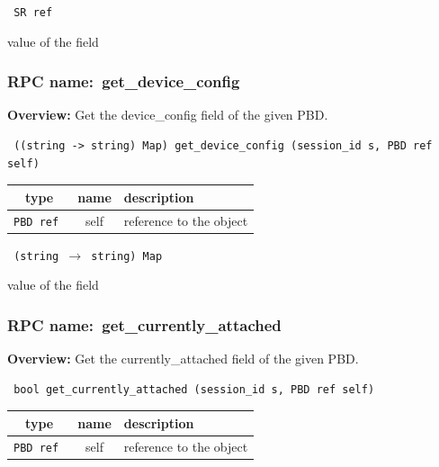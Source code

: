 \vspace{0.3cm}

{\tt 
SR ref
}


value of the field
\vspace{0.3cm}
\vspace{0.3cm}
\vspace{0.3cm}
\subsubsection{RPC name:~get\_device\_config}

{\bf Overview:} 
Get the device\_config field of the given PBD.

\begin{verbatim} ((string -> string) Map) get_device_config (session_id s, PBD ref self)\end{verbatim}



 
\vspace{0.3cm}
\begin{tabular}{|c|c|p{7cm}|}
 \hline
{\bf type} & {\bf name} & {\bf description} \\ \hline
{\tt PBD ref } & self & reference to the object \\ \hline 

\end{tabular}

\vspace{0.3cm}

{\tt 
(string $\rightarrow$ string) Map
}


value of the field
\vspace{0.3cm}
\vspace{0.3cm}
\vspace{0.3cm}
\subsubsection{RPC name:~get\_currently\_attached}

{\bf Overview:} 
Get the currently\_attached field of the given PBD.

\begin{verbatim} bool get_currently_attached (session_id s, PBD ref self)\end{verbatim}



 
\vspace{0.3cm}
\begin{tabular}{|c|c|p{7cm}|}
 \hline
{\bf type} & {\bf name} & {\bf description} \\ \hline
{\tt PBD ref } & self & reference to the object \\ \hline 

\end{tabular}

